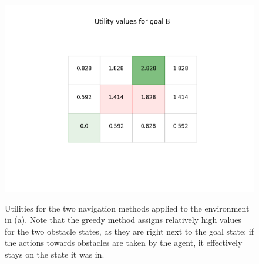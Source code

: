 \begin{figure}
{		\includegraphics[width=.95\linewidth, trim=3cm 3cm 3cm 2cm,clip]{res/utilities_greedy}
	}
	\caption{Utilities for the two navigation methods applied to the environment in (a). Note that the greedy method assigns relatively high values for the two obstacle states, as they are right next to the goal state; if the actions towards obstacles are taken by the agent, it effectively stays on the state it was in.}
	\label{fig:utilities}
\end{figure}

